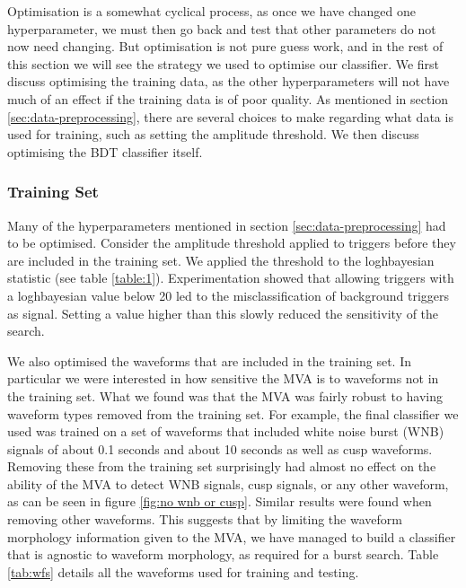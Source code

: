 \documentclass[11pt]{cuthesis}
\begin{document}
Optimisation is a somewhat cyclical process, as once we have changed one hyperparameter, we must then go back and test that other parameters do not now need changing. But optimisation is not pure guess work, and in the rest of this section we will see the strategy we used to optimise our classifier. We first discuss optimising the training data, as the other hyperparameters will not have much of an effect if the training data is of poor quality. As mentioned in section \ref{sec:data-preprocessing}, there are several choices to make regarding what data is used for training, such as setting the amplitude threshold. We then discuss optimising the BDT classifier itself. 

\subsubsection{Training Set}
Many of the hyperparameters mentioned in section \ref{sec:data-preprocessing} had to be optimised. Consider the amplitude threshold applied to triggers before they are included in the training set. We applied the threshold to the loghbayesian statistic (see table \ref{table:1}). Experimentation showed that allowing triggers with a loghbayesian value below 20 led to the misclassification of background triggers as signal. Setting a value higher than this slowly reduced the sensitivity of the search.   

We also optimised the waveforms that are included in the training set. In particular we were interested in how sensitive the MVA is to waveforms not in the training set. What we found was that the MVA was fairly robust to having waveform types removed from the training set. For example, the final classifier we used was trained on a set of waveforms that included white noise burst (WNB) signals of about 0.1 seconds and about 10 seconds as well as cusp waveforms. Removing these from the training set surprisingly had almost no effect on the ability of the MVA to detect WNB signals, cusp signals, or any other waveform, as can be seen in figure \ref{fig:no wnb or cusp}. Similar results were found when removing other waveforms. This suggests that by limiting the waveform morphology information given to the MVA, we have managed to build a classifier that is agnostic to waveform morphology, as required for a burst search. Table \ref{tab:wfs} details all the waveforms used for training and testing.
\end{document}
